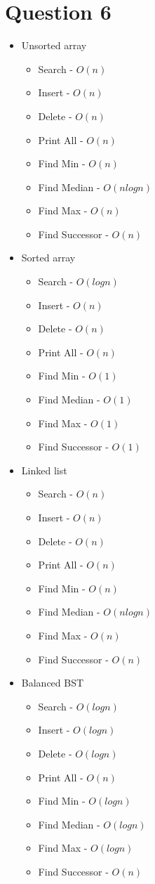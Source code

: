 \documentclass{article}
\begin{document}
\section{Question 6}
	\begin{itemize}
		\item Unsorted array
		\begin{itemize}
			\item Search - $O(n)$
			\item Insert - $O(n)$
			\item Delete - $O(n)$
			\item Print All - $O(n)$
			\item Find Min - $O(n)$
			\item Find Median - $O(nlogn)$
			\item Find Max - $O(n)$
			\item Find Successor - $O(n)$
		\end{itemize}
		\item Sorted array
		\begin{itemize}
			\item Search - $O(logn)$
			\item Insert - $O(n)$
			\item Delete - $O(n)$
			\item Print All - $O(n)$
			\item Find Min - $O(1)$
			\item Find Median - $O(1)$
			\item Find Max - $O(1)$
			\item Find Successor - $O(1)$
		\end{itemize}
		\item Linked list
		\begin{itemize}
			\item Search - $O(n)$
			\item Insert - $O(n)$
			\item Delete - $O(n)$
			\item Print All - $O(n)$
			\item Find Min - $O(n)$
			\item Find Median - $O(nlogn)$
			\item Find Max - $O(n)$
			\item Find Successor - $O(n)$
		\end{itemize}
		\item Balanced BST
		\begin{itemize}
			\item Search - $O(logn)$
			\item Insert - $O(logn)$
			\item Delete - $O(logn)$
			\item Print All - $O(n)$
			\item Find Min - $O(logn)$
			\item Find Median - $O(logn)$
			\item Find Max - $O(logn)$
			\item Find Successor - $O(n)$
		\end{itemize}
	\end{itemize}
	
\end{document}

